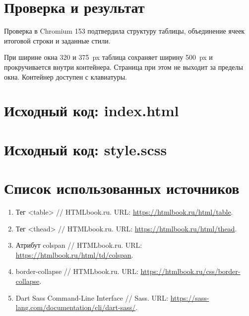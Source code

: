 \documentclass[14pt,a4paper]{extarticle}
\newcommand{\listing}[1]{\begingroup\singlespacing\setlength{\topsep}{0pt}\setlength{\partopsep}{0pt}\endgroup}
\begin{document}
\vspace{6mm}
\section{Проверка и результат}
Проверка в Chromium 153 подтвердила структуру таблицы, объединение ячеек итоговой строки и заданные стили.

При ширине окна 320 и 375~px таблица сохраняет ширину 500~px и прокручивается внутри контейнера. Страница при этом не выходит за пределы окна. Контейнер доступен с клавиатуры.


\clearpage
\section{Исходный код: index.html}
\listing{index.html}

\clearpage
\section{Исходный код: style.scss}
\listing{style.scss}
\clearpage
\section*{Список использованных источников}
\begin{enumerate}[label=\arabic*.,leftmargin=8mm,itemsep=8pt,parsep=0pt]
\item Тег <table> // HTMLbook.ru. URL: \url{https://htmlbook.ru/html/table}.
\item Тег <thead> // HTMLbook.ru. URL: \url{https://htmlbook.ru/html/thead}.
\item Атрибут colspan // HTMLbook.ru. URL: \url{https://htmlbook.ru/html/td/colspan}.
\item border-collapse // HTMLbook.ru. URL: \url{https://htmlbook.ru/css/border-collapse}.
\item Dart Sass Command-Line Interface // Sass. URL: \url{https://sass-lang.com/documentation/cli/dart-sass/}.
\end{enumerate}
\end{document}
